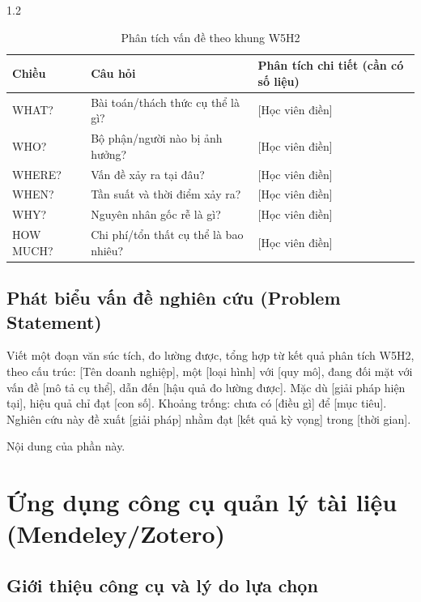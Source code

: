 \begin{spacing}{1.2}
\begin{table}[htpb]
\centering
\caption{Phân tích vấn đề theo khung W5H2}
\label{tab:w5h2}
\renewcommand{\arraystretch}{1.3}
{\fontsize{12}{14}\selectfont
\begin{tabularx}{\textwidth}{|>{\raggedright\arraybackslash}p{2.6cm}|>{\raggedright\arraybackslash}p{4.6cm}|X|}
\hline
\textbf{Chiều} & \textbf{Câu hỏi} & \textbf{Phân tích chi tiết (cần có số liệu)} \\
\hline
WHAT? & Bài toán/thách thức cụ thể là gì? & [Học viên điền] \\
\hline
WHO? & Bộ phận/người nào bị ảnh hưởng? & [Học viên điền] \\
\hline
WHERE? & Vấn đề xảy ra tại đâu? & [Học viên điền] \\
\hline
WHEN? & Tần suất và thời điểm xảy ra? & [Học viên điền] \\
\hline
WHY? & Nguyên nhân gốc rễ là gì? & [Học viên điền] \\
\hline
HOW MUCH? & Chi phí/tổn thất cụ thể là bao nhiêu? & [Học viên điền] \\
\hline
\end{tabularx}
}
\end{table}

\subsection{Phát biểu vấn đề nghiên cứu (Problem Statement)}
\label{subsec:problem_statement}

\begin{huongdan}
Viết một đoạn văn súc tích, đo lường được, tổng hợp từ kết quả phân tích W5H2, theo cấu trúc: [Tên doanh nghiệp], một [loại hình] với [quy mô], đang đối mặt với vấn đề [mô tả cụ thể], dẫn đến [hậu quả đo lường được]. Mặc dù [giải pháp hiện tại], hiệu quả chỉ đạt [con số]. Khoảng trống: chưa có [điều gì] để [mục tiêu]. Nghiên cứu này đề xuất [giải pháp] nhằm đạt [kết quả kỳ vọng] trong [thời gian].
\end{huongdan}

Nội dung của phần này.

\section{Ứng dụng công cụ quản lý tài liệu (Mendeley/Zotero)}
\label{sec:cong_cu_tai_lieu}

\subsection{Giới thiệu công cụ và lý do lựa chọn}
\label{subsec:gioi_thieu_cong_cu}


\end{spacing}
